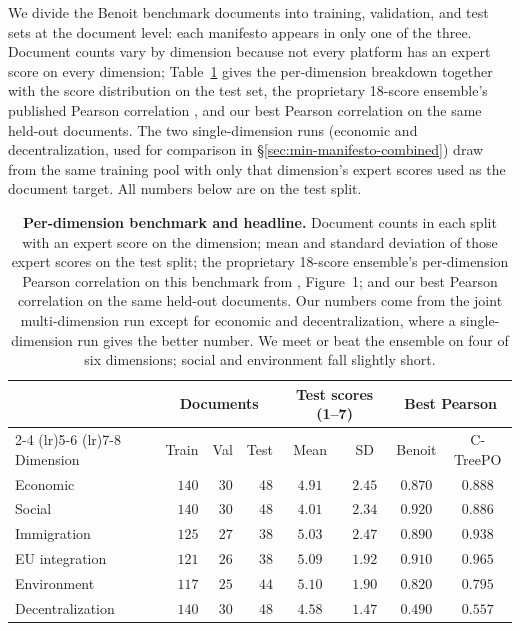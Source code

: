 We divide the Benoit benchmark documents into training,
validation, and test sets at the document level: each manifesto
appears in only one of the three. Document counts vary by
dimension because not every platform has an expert score on every
dimension; Table~\ref{tab:min-manifesto-data-summary} gives the
per-dimension breakdown together with the score distribution on
the test set, the proprietary 18-score ensemble's published
Pearson correlation \citep{BenoitEtAl2025}, and our best Pearson
correlation on the same held-out documents. The two
single-dimension runs (economic and decentralization, used for
comparison in \S\ref{sec:min-manifesto-combined}) draw from the
same training pool with only that dimension's expert scores used
as the document target. All numbers below are on the test split.

\begin{table}[!htb]
  \centering
  \begin{tabular}{lrrrcccc}
    \toprule
    & \multicolumn{3}{c}{Documents} & \multicolumn{2}{c}{Test scores (1--7)} & \multicolumn{2}{c}{Best Pearson} \\
    \cmidrule(lr){2-4} \cmidrule(lr){5-6} \cmidrule(lr){7-8}
    Dimension & Train & Val & Test & Mean & SD & Benoit & C-TreePO \\
    \midrule
    Economic         & $140$ & $30$ & $48$ & $4.91$ & $2.45$ & $0.870$ & $0.888$ \\
    Social           & $140$ & $30$ & $48$ & $4.01$ & $2.34$ & $0.920$ & $0.886$ \\
    Immigration      & $125$ & $27$ & $38$ & $5.03$ & $2.47$ & $0.890$ & $0.938$ \\
    EU integration   & $121$ & $26$ & $38$ & $5.09$ & $1.92$ & $0.910$ & $0.965$ \\
    Environment      & $117$ & $25$ & $44$ & $5.10$ & $1.90$ & $0.820$ & $0.795$ \\
    Decentralization & $140$ & $30$ & $48$ & $4.58$ & $1.47$ & $0.490$ & $0.557$ \\
    \bottomrule
  \end{tabular}
  \caption{\textbf{Per-dimension benchmark and headline.} Document
  counts in each split with an expert score on the dimension; mean
  and standard deviation of those expert scores on the test split;
  the proprietary 18-score ensemble's per-dimension Pearson
  correlation on this benchmark from \citet{BenoitEtAl2025},
  Figure~1; and our best Pearson correlation on the same held-out
  documents. Our numbers come from the
  joint multi-dimension run except for economic and
  decentralization, where a single-dimension run gives the better
  number. We meet or beat the ensemble on four of six dimensions;
  social and environment fall slightly short.}
  \label{tab:min-manifesto-data-summary}
\end{table}

